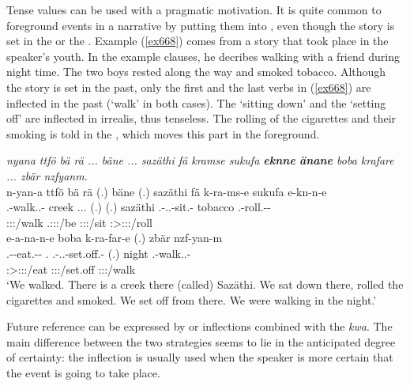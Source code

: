Tense values can be used with a pragmatic motivation. It is quite common to foreground events in a narrative by putting them into , even though the story is set in the  or the . Example (\ref{ex668}) comes from a story that took place in the speaker's youth. In the example clauses, he decribes walking with a friend during night time. The two boys rested along the way and smoked tobacco. Although the story is set in the past, only the first and the last verbs in (\ref{ex668}) are inflected in the past  (`walk' in both cases). The `sitting down' and the `setting off' are inflected in irrealis, thus tenseless. The rolling of the cigarettes and their smoking is told in the , which moves this part in the foreground.

\begin{exe}
	\ex \emph{nyana ttfö bä rä ... bäne ... sazäthi fä kramse sukufa \textbf{eknne} \textbf{änane} boba krafare ... zbär nzfyanm.}\\
	\glll n-yan-a ttfö bä rä (.) bäne (.) sazäthi fä k-ra-ms-e sukufa e-kn-n-e\\
	\Fnsg.\Alph-walk.\Ext.\Du-\Pst{} creek \Med{} \Tsg.\F.\Cop.\Ndu{} (.) \Recog{} (.) sazäthi \Dist{} \Med.\Bet-\Irr.\Vc.\Du-sit.\Rs-\Fnsg{} tobacco \Stnsg.\Alph-roll.\Ext-\Du-\Fnsg{}\\
	\footnotesize{\Fdu:\Sbj:\Pst:\Ipfv/walk} {} {} \footnotesize{\Tsg.\F:\Sbj:\Nonpast:\Ipfv/be} {} {} {} {} {} \footnotesize{\Fdu:\Sbj:\Irr:\Pfv/sit} {} \footnotesize{\Fdu:\Sbj>\Stpl:\Obj:\Nonpast:\Ipfv/roll}\\
	\sn
	\glll e-a-na-n-e boba k-ra-far-e (.) zbär nzf-yan-m\\
	\Stnsg.\Alph-\Vc-eat.\Ext-\Du-\Fnsg{} \Med.\Abl{} \Med.\Alph-\Irr.\Vc.\Du-set.off.\Rs-\Fnsg{} (.) night \Fnsg.\Betatwo-walk.\Ext.\Du-\Dur{}\\
	\footnotesize{\Fdu:\Sbj>\Stpl:\Obj:\Nonpast:\Ipfv/eat} {} \footnotesize{\Fdu:\Sbj:\Irr:\Pfv/set.off} {} {} \footnotesize{\Fdu:\Sbj:\Pst:\Dur/walk}\\
	\trans `We walked. There is a creek there (called) Sazäthi. We sat down there, rolled the cigarettes and smoked. We set off from there. We were walking in the night.'
	\label{ex668}
\end{exe}

Future reference can be expressed by  or  inflections combined with the   \emph{kwa}. The main difference between the two strategies seems to lie in the anticipated degree of certainty: the  inflection is usually used when the speaker is more certain that the event is going to take place.

